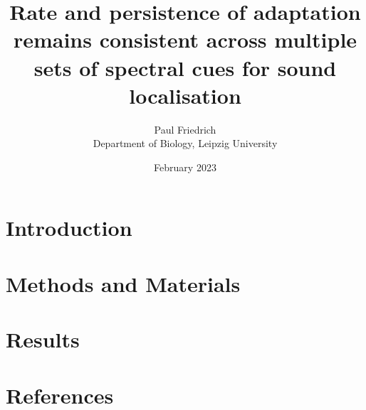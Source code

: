 \documentclass[10pt]{article}
\newcommand\thesistitle{Rate and persistence of adaptation remains consistent across multiple sets of spectral cues for sound localisation}%
\begin{document}
\title{\thesistitle}%
\author{Paul Friedrich\\Department of Biology, Leipzig University}
\date{February 2023}
\maketitle

\newpage%
\begin{multicols}{2}
\section{Introduction}\label{sec1}


\newpage
\section{Methods and Materials}\label{sec2}%


\newpage
\section{Results}\label{sec3}%


\end{multicols} %


%
\newpage\section{References}
\nocite{*}

%
\end{document}
